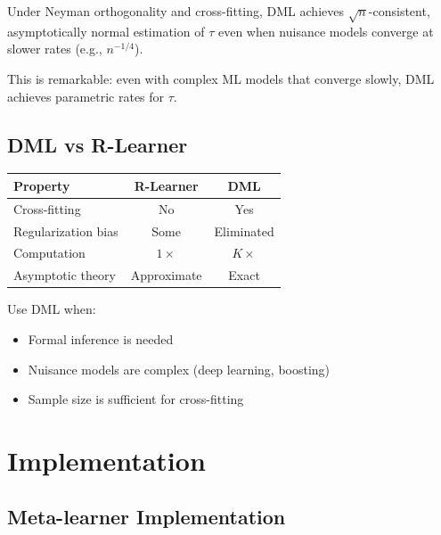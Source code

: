 \begin{theorem}
Under Neyman orthogonality and cross-fitting, DML achieves $\sqrt{n}$-consistent, asymptotically normal estimation of $\tau$ even when nuisance models converge at slower rates (e.g., $n^{-1/4}$).
\end{theorem}

This is remarkable: even with complex ML models that converge slowly, DML achieves parametric rates for $\tau$.

\subsection{DML vs R-Learner}

\begin{center}
\begin{tabular}{lcc}
\toprule
Property & R-Learner & DML \\
\midrule
Cross-fitting & No & Yes \\
Regularization bias & Some & Eliminated \\
Computation & $1\times$ & $K\times$ \\
Asymptotic theory & Approximate & Exact \\
\bottomrule
\end{tabular}
\end{center}

Use DML when:
\begin{itemize}
    \item Formal inference is needed
    \item Nuisance models are complex (deep learning, boosting)
    \item Sample size is sufficient for cross-fitting
\end{itemize}

\section{Implementation}
\label{sec:cate_implementation}

\subsection{Meta-learner Implementation}

